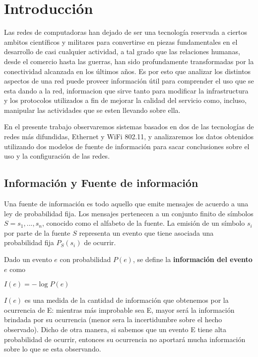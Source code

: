 \section{Introducción}

Las redes de computadoras han dejado de ser 
una tecnología reservada a ciertos ambitos científicos y militares para convertirse
en piezas fundamentales en el desarrollo de casi cualquier actividad, a tal grado que las relaciones humanas, 
desde el comercio hasta las guerras, han sido profundamente transformadas por la conectividad
alcanzada en los últimos años.  
Es por esto que analizar los distintos aspectos de una red
puede proveer información útil para comprender el uso que se esta dando a la red, informacion que sirve tanto para
modificar la infrastructura y los protocolos
utilizados a fin de mejorar la calidad del servicio como, incluso,  manipular las actividades que se esten llevando sobre ella.


En el presente trabajo observaremos sistemas basados en dos de las tecnologías de redes más difundidas, Ethernet y WiFi 802.11, y analizaremos los datos obtenidos utilizando dos modelos de fuente de información para sacar conclusiones sobre el uso y la configuración de las redes.


\subsection{Información y Fuente de información}

Una fuente de información es todo aquello que emite mensajes de acuerdo a una ley de probabilidad fija. Los mensajes pertenecen a un conjunto finito de símbolos $S={s_{1},...,s_{n}}$, conocido como el alfabeto de la fuente. La emisión de un símbolo $s_i$ por parte de la fuente $S$ representa un evento que tiene asociada una probabilidad fija $P_S(s_i)$ de ocurrir. 

Dado un evento $e$ con probabilidad $P(e)$, se define la \textbf{información del evento $e$} como

\begin{center}
$I(e)=-\log{P(e)}$ 
\end{center}

$I(e)$ es una medida de la cantidad de información que obtenemos por la ocurrencia de E: mientras más improbable sea E, mayor será la información brindada por su ocurrencia (menor sera la incertidumbre sobre el hecho observado). Dicho de otra manera, si sabemos que un evento E tiene alta probabilidad de ocurrir, entonces su ocurrencia no aportará mucha información sobre lo que se esta observando.



